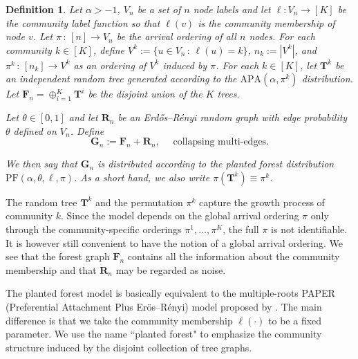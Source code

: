 \documentclass[twoside,11pt]{article}
\newtheorem{defin}[theorem]{Definition}
\theoremstyle{remark}
\begin{document}
\begin{defin}
\label{defin: PF}
Let  $\alpha>-1$, $V_n$ be a set of $n$ node labels and let $\ell : V_n \rightarrow [K]$ be the community label function so that $\ell(v)$ is the community membership of node $v$. Let $\pi \,:\, [n] \rightarrow V_n$ be the arrival ordering of all $n$ nodes. For each community $k \in [K]$, define $V^k := \{ u \in V_n \,:\, \ell(u) = k \}$, $n_k := |V^k|$, and $\pi^k \,:\, [n_k] \rightarrow V^k$ as an ordering of $V^k$ induced by $\pi$. For each $k \in [K]$, let $\bm{T}^k$ be an independent random tree generated according to the $\mathrm{APA}(\alpha, \pi^k)$ distribution. Let $\boldsymbol{F}_n=\oplus_{i=1}^K \boldsymbol{T}^i$ be the disjoint union of the $K$ trees. 

Let $\theta \in [0, 1]$ and let $\boldsymbol{R}_n$ be an Erd\H{o}s--R\'enyi random graph with edge probability $\theta$ defined on $V_n$. Define
\begin{equation}
\label{decomposition}
  \boldsymbol{G}_n := \boldsymbol{F}_n + \bm{R}_n,\quad \text{ collapsing multi-edges.}
\end{equation}

We then say that $\boldsymbol{G}_n$ is distributed according to the planted forest distribution $\mathrm{PF}(\alpha, \theta, \ell, \pi)$. As a short hand, we also write $\pi(\bm{T}^k) \equiv \pi^k$. 
\end{defin}

The random tree $\bm{T}^k$ and the permutation $\pi^k$ capture the growth process of community $k$. Since the model depends on the global arrival ordering $\pi$ only through the community-specific orderings $\pi^1, \ldots, \pi^K$, the full $\pi$ is not identifiable. It is however still convenient to have the notion of a global arrival ordering. We see that the forest graph $\bm{F}_n$ contains all the information about the community membership and that $\bm{R}_n$ may be regarded as noise. 

\begin{remark}
The planted forest model is basically equivalent to the multiple-roots PAPER (Preferential Attachment Plus Er\"{o}s--R\'{e}nyi) model proposed by \cite{crane2024root}. The main difference is that we take the community membership $\ell(\cdot)$ to be a fixed parameter. We use the name ``planted forest" to emphasize the community structure induced by the disjoint collection of tree graphs. 
\end{remark}
\end{document}
